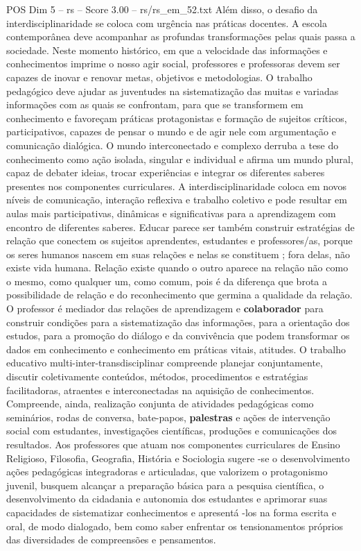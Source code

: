 \begin{textsample}{POS Dim 5 – rs – Score 3.00 – rs/rs\_em\_52.txt}
Além disso, o desafio da interdisciplinaridade se coloca com urgência nas práticas docentes.
A escola contemporânea deve acompanhar as profundas transformações pelas quais passa a sociedade.
Neste momento histórico, em que a velocidade das informações e conhecimentos imprime o nosso agir social, professores e professoras devem ser capazes de inovar e renovar metas, objetivos e metodologias.
O trabalho pedagógico deve ajudar as juventudes na sistematização das muitas e variadas informações com as quais se confrontam, para que se transformem em conhecimento e favoreçam práticas protagonistas e formação de sujeitos críticos, participativos, capazes de pensar o mundo e de agir nele com argumentação e comunicação dialógica.
O mundo interconectado e complexo derruba a tese do conhecimento como ação isolada, singular e individual e afirma um mundo plural, capaz de debater ideias, trocar experiências e integrar os diferentes saberes presentes nos componentes curriculares.
A interdisciplinaridade coloca em novos níveis de comunicação, interação reflexiva e trabalho coletivo e pode resultar em aulas mais participativas, dinâmicas e significativas para a aprendizagem com encontro de diferentes saberes.
Educar parece ser também construir estratégias de relação que conectem os sujeitos aprendentes, estudantes e professores/as, porque os seres humanos nascem em suas relações e nelas se constituem ; fora delas, não existe vida humana.
Relação existe quando o outro aparece na relação não como o mesmo, como qualquer um, como comum, pois é da diferença que brota a possibilidade de relação e do reconhecimento que germina a qualidade da relação.
O professor é mediador das relações de aprendizagem e \textbf{colaborador} para construir condições para a sistematização das informações, para a orientação dos estudos, para a promoção do diálogo e da convivência que podem transformar os dados em conhecimento e conhecimento em práticas vitais, atitudes.
O trabalho educativo multi-inter-transdisciplinar compreende planejar conjuntamente, discutir coletivamente conteúdos, métodos, procedimentos e estratégias facilitadoras, atraentes e interconectadas na aquisição de conhecimentos.
Compreende, ainda, realização conjunta de atividades pedagógicas como seminários, rodas de conversa, bate-papos, \textbf{palestras} e ações de intervenção social com estudantes, investigações científicas, produções e comunicações dos resultados.
Aos professores que atuam nos componentes curriculares de Ensino Religioso, Filosofia, Geografia, História e Sociologia sugere -se o desenvolvimento ações pedagógicas integradoras e articuladas, que valorizem o protagonismo juvenil, busquem alcançar a preparação básica para a pesquisa científica, o desenvolvimento da cidadania e autonomia dos estudantes e aprimorar suas capacidades de sistematizar conhecimentos e apresentá -los na forma escrita e oral, de modo dialogado, bem como saber enfrentar os tensionamentos próprios das diversidades de compreensões e pensamentos.

\end{textsample}
